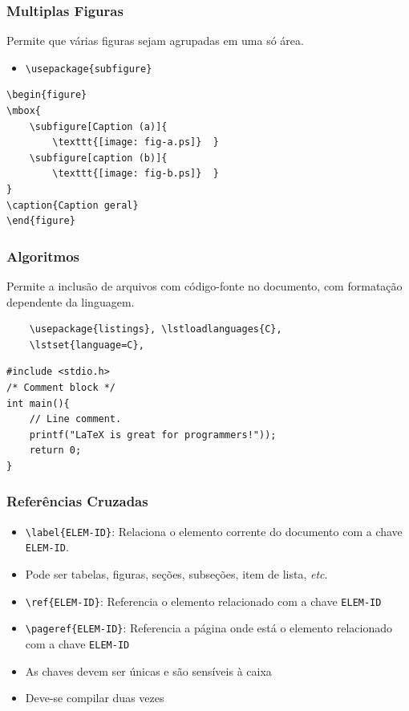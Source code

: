 \begin{frame}[fragile]
\frametitle{Multiplas Figuras}

Permite que várias figuras sejam agrupadas em uma só área.
    \begin{itemize}
    	\item \verb|\usepackage{subfigure}|
    \end{itemize}
    
\begin{verbatim}
\begin{figure}
\mbox{
    \subfigure[Caption (a)]{  
        \texttt{[image: fig-a.ps]}  }
    \subfigure[caption (b)]{ 
        \texttt{[image: fig-b.ps]}  }
}
\caption{Caption geral}
\end{figure}
\end{verbatim}

 
\end{frame}
\begin{frame}[fragile]
\frametitle{Algoritmos}

Permite a inclusão de arquivos com código\hyp{}fonte no documento, com formatação
  dependente da linguagem.
  \begin{verbatim}
  	\usepackage{listings}, \lstloadlanguages{C},
  	\lstset{language=C}, 
  \end{verbatim}

\begin{framed}
\small
\begin{lstlisting}
#include <stdio.h>
/* Comment block */
int main(){
    // Line comment.
    printf("LaTeX is great for programmers!"));
    return 0;
}
\end{lstlisting} 
\end{framed}
\end{frame}

\begin{frame}[fragile]
\frametitle{Referências Cruzadas}

\begin{itemize}
  \item \verb|\label{ELEM-ID}|: Relaciona o elemento corrente do documento com a chave
  \texttt{ELEM-ID}.
  \item  Pode ser tabelas, figuras, seções, subseções, item de lista, \textit{etc}.
  \item \verb|\ref{ELEM-ID}|: Referencia o elemento relacionado com a chave \texttt{ELEM-ID}
  \item \verb|\pageref{ELEM-ID}|: Referencia a página onde está o elemento relacionado com
  a chave \texttt{ELEM-ID}
  \item As chaves devem ser únicas e são sensíveis à caixa
  \item Deve-se compilar duas vezes
\end{itemize}
 
\end{frame}


